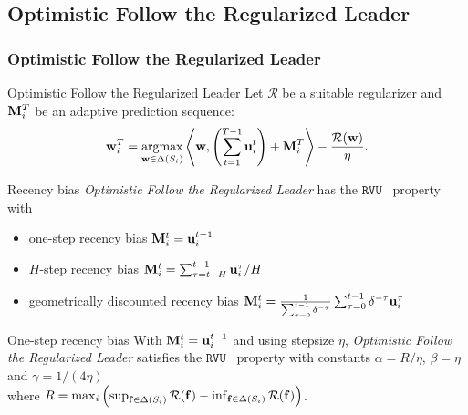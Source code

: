 \documentclass{beamer}
\renewcommand{\vec}[1]{\ensuremath{{\bf #1}}}
\newcommand{\dotp}[2]{\ensuremath{\left\langle #1, #2 \right\rangle}}
\newcommand{\mst}{\ensuremath{w}}
\newcommand{\myprop}{\ensuremath{\texttt{RVU}}}
\newcommand{\mR}{\ensuremath{\mathcal{R}}}
\DeclareMathOperator*{\argmax}{argmax}
\begin{document}
\subsection{Optimistic Follow the Regularized Leader}

\begin{frame}
	\frametitle{Optimistic Follow the Regularized Leader}
	\begin{block}{Optimistic Follow the Regularized Leader}
		Let $\mR$ be a suitable regularizer and\\
		$\vec{M}_i^T$ be an adaptive prediction sequence:
	\begin{equation*}
	\vec{\mst}_i^T
	= \argmax_{\vec{\mst} \in \Delta(S_i)} \dotp{\vec{\mst}}{\left(\sum_{t=1}^{T-1} \vec{u}_i^t\right)
		+ \vec{M}_i^T}-\frac{\mR(\vec{\mst})}{\eta}.
	\end{equation*}
	\end{block}
	\pause
	
	\begin{block}{Recency bias}
		\textit{Optimistic Follow the Regularized Leader} has the \myprop~ property with\\
		\begin{itemize}
			\item one-step recency bias $\vec{M}_i^t = \vec{u}_i^{t-1}$
			\item $H$-step recency bias $\vec{M}_i^t = \sum_{\tau = t-H}^{t-1} \vec{u}_i^\tau/H$
			\item geometrically discounted recency bias $\vec{M}_i^t
			= \frac{1}{\sum_{\tau = 0}^{t-1} \delta^{-\tau}} \sum_{\tau =
				0}^{t-1} \delta^{-\tau} \vec{u}_i^\tau$
		\end{itemize}
		
		
	\end{block}
	
\end{frame}

\begin{frame}
		
		\begin{block}{One-step recency bias}
			With $\vec{M}_i^t = \vec{u}_i^{t-1}$ and using stepsize $\eta$, \textit{Optimistic Follow the Regularized Leader} satisfies the \myprop~ property 
			with constants
			$\alpha = R/\eta$, $\beta = \eta$ and $\gamma
			= 1/(4\eta)$\\
			where $R = \max_i \left(\sup_{\vec{f}\in \Delta(S_i)} \mR(\vec{f})-\inf_{\vec{f}\in \Delta(S_i)}\mR(\vec{f})\right)$.
			
		\end{block}
\end{frame}
\end{document}
